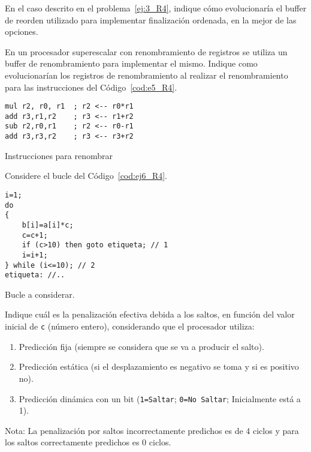 \begin{ejercicio}
    En el caso descrito en el problema~\ref{ej:3_R4}, indique cómo evolucionaría el buffer de reorden utilizado para implementar finalización ordenada, en la mejor de las opciones. 
\end{ejercicio}

\begin{ejercicio}
    En un procesador superescalar con renombramiento de registros se utiliza un buffer de renombramiento para implementar el mismo. Indique como evolucionarían los registros de renombramiento al realizar el renombramiento para las instrucciones del Código~\ref{cod:e5_R4}.
   \begin{listing}[H]
   \begin{verbatim}
mul r2, r0, r1  ; r2 <-- r0*r1
add r3,r1,r2    ; r3 <-- r1+r2
sub r2,r0,r1    ; r2 <-- r0-r1
add r3,r3,r2    ; r3 <-- r3+r2
   \end{verbatim}
   \caption{Instrucciones para renombrar}
   \label{cod:e5_R4}
   \end{listing}
\end{ejercicio}

\begin{ejercicio}\label{ej:6_R4}
    Considere el bucle del Código~\ref{cod:ej6_R4}.
    \begin{listing}[H]
    \begin{verbatim}
i=1;
do
{
    b[i]=a[i]*c;
    c=c+1;
    if (c>10) then goto etiqueta; // 1
    i=i+1;
} while (i<=10); // 2
etiqueta: //..
    \end{verbatim}
    \caption{Bucle a considerar.}
    \label{cod:ej6_R4}
    \end{listing}

Indique cuál es la penalización efectiva debida a los saltos, en función del valor inicial de \verb|c| (número entero), considerando que el procesador utiliza:
\begin{enumerate}
    \item Predicción fija (siempre se considera que se va a producir el salto).
    \item Predicción estática (si el desplazamiento es negativo se toma y si es positivo no).
    \item Predicción dinámica con un bit (\verb|1=Saltar|; \verb|0=No Saltar|; Inicialmente está a 1).
\end{enumerate}
Nota: La penalización por saltos incorrectamente predichos es de 4 ciclos y para los saltos correctamente predichos es 0 ciclos.
\end{ejercicio}

